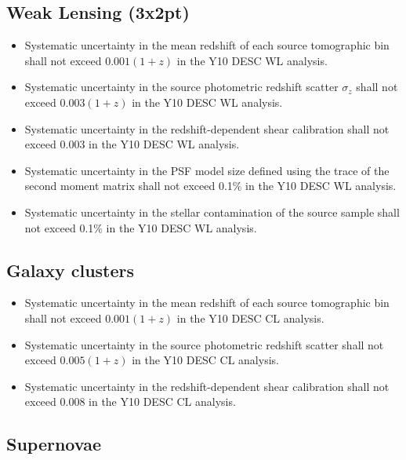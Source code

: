 \documentclass[modern]{desc-tex/styles/lsstdescnote}
\begin{document}
\subsection{Weak Lensing (3x2pt)}

\begin{itemize}
\item Systematic uncertainty in the mean redshift of each source tomographic bin shall not exceed $0.001 (1 + z)$ in the Y10 DESC WL analysis.
\item Systematic uncertainty in the source photometric redshift scatter $\sigma_z$  shall not exceed $0.003 (1 + z) $ in the Y10 DESC WL analysis.
\item Systematic uncertainty in the redshift-dependent shear calibration shall not exceed 0.003 in the Y10 DESC WL analysis.
\item Systematic uncertainty in the PSF model size defined using the trace of the second moment matrix shall not exceed 0.1\% in the Y10 DESC WL analysis.
\item Systematic uncertainty in the stellar contamination of the source sample shall not exceed 0.1\% in the Y10 DESC WL analysis.
\end{itemize}

\subsection{Galaxy clusters}

\begin{itemize}
\item Systematic uncertainty in the mean redshift of each source tomographic bin shall not exceed $ 0.001( 1 + z)$ in the Y10 DESC CL analysis.
\item Systematic uncertainty in the source photometric redshift scatter shall not exceed $0.005 (1 + z)$ in the Y10 DESC CL analysis.
\item Systematic uncertainty in the redshift-dependent shear calibration shall not exceed 0.008 in the Y10 DESC CL analysis.
\end{itemize}

\subsection{Supernovae}
\end{document}
